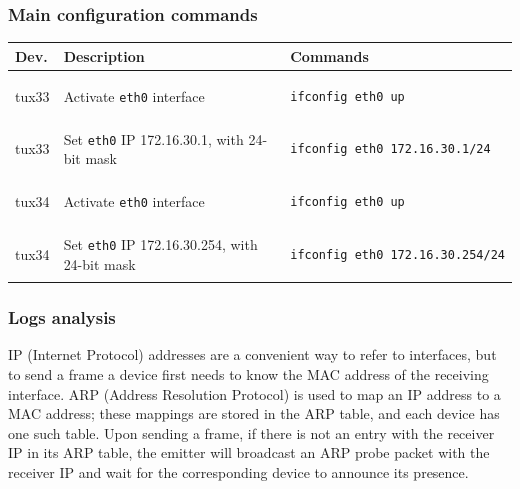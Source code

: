 \documentclass[a4paper, 11pt]{report}
\begin{document}
\subsubsection{Main configuration commands} \label{sec:Com1}

\begin{center}
    \small
    \begin{tabular}{@{}l | m{87mm} | l@{}}
        {\normalfont\textbf{Dev.}} & {\normalfont\textbf{Description}} & {\normalfont\textbf{Commands}}  \\ \hline
        tux33         & Activate \texttt{eth0} interface                     & \begin{lstlisting}[basicstyle=\linespread{0.85}\ttfamily\small, frame=none, numbers=none, language=sh]
ifconfig eth0 up
        \end{lstlisting}               \\
        tux33         & Set \texttt{eth0} IP 172.16.30.1, with 24-bit mask   & \begin{lstlisting}[basicstyle=\linespread{0.85}\ttfamily\small, frame=none, numbers=none, language=sh]
ifconfig eth0 172.16.30.1/24
        \end{lstlisting} \\ \hline
        tux34         & Activate \texttt{eth0} interface                     & \begin{lstlisting}[basicstyle=\linespread{0.85}\ttfamily\small, frame=none, numbers=none, language=sh]
ifconfig eth0 up
        \end{lstlisting}\\
        tux34         & Set \texttt{eth0} IP 172.16.30.254, with 24-bit mask & \begin{lstlisting}[basicstyle=\linespread{0.85}\ttfamily\small, frame=none, numbers=none, language=sh]
ifconfig eth0 172.16.30.254/24
        \end{lstlisting} \\
    \end{tabular}
\end{center}

\subsubsection{Logs analysis} \label{sec:Log1}

IP (Internet Protocol) addresses are a convenient way to refer to interfaces, but to send a frame a device first needs to know the MAC address of the receiving interface.
ARP (Address Resolution Protocol) is used to map an IP address to a MAC address; these mappings are stored in the ARP table, and each device has one such table.
Upon sending a frame, if there is not an entry with the receiver IP in its ARP table, the emitter will broadcast an ARP probe packet with the receiver IP and wait for the corresponding device to announce its presence.
\end{document}
